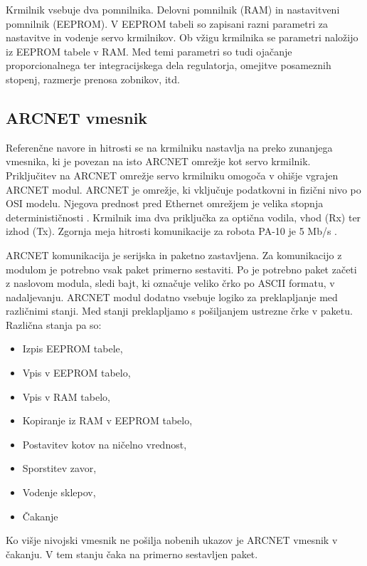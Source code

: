\documentclass[a4paper]{article}
\begin{document}
Krmilnik vsebuje dva pomnilnika. Delovni pomnilnik (RAM) in nastavitveni pomnilnik (EEPROM). V EEPROM tabeli so zapisani razni parametri za nastavitve in vodenje servo krmilnikov. Ob vžigu krmilnika se parametri naložijo iz EEPROM tabele v RAM. Med temi parametri so tudi ojačanje proporcionalnega ter integracijskega dela regulatorja, omejitve posameznih stopenj, razmerje prenosa zobnikov, itd.

\subsection{ARCNET vmesnik}\label{sec:arc_drive}

Referenčne navore in hitrosti se na krmilniku nastavlja na preko zunanjega vmesnika, ki je povezan na isto ARCNET omrežje kot servo krmilnik. Priključitev na ARCNET omrežje servo krmilniku omogoča v ohišje vgrajen ARCNET modul. ARCNET je omrežje, ki vključuje podatkovni in fizični nivo po OSI modelu. Njegova prednost pred Ethernet omrežjem je velika stopnja determinističnosti \cite{arc_tutorial}. Krmilnik ima dva priključka za optična 
vodila, vhod (Rx) ter izhod (Tx). Zgornja meja hitrosti komunikacije za robota PA-10 je 5 Mb/s \cite{pa10-manual}.

ARCNET komunikacija je serijska in paketno zastavljena. Za komunikacijo z modulom je potrebno vsak paket primerno sestaviti. Po \cite{pa10-manual} je potrebno paket začeti z naslovom modula, sledi bajt, ki označuje veliko črko po ASCII formatu, v nadaljevanju. ARCNET modul dodatno vsebuje logiko za preklapljanje med različnimi stanji. Med stanji preklapljamo s pošiljanjem ustrezne črke v paketu. Različna stanja pa so:


\begin{itemize}
	\item Izpis EEPROM tabele,
	\item Vpis v EEPROM tabelo,
	\item Vpis v RAM tabelo,
	\item Kopiranje iz RAM v EEPROM tabelo,
	\item Postavitev kotov na ničelno vrednost,	
	\item Sporstitev zavor,
	\item Vodenje sklepov,
	\item Čakanje
\end{itemize}

Ko višje nivojski vmesnik ne pošilja nobenih ukazov je ARCNET vmesnik v čakanju. V tem stanju čaka na primerno sestavljen paket.
\end{document}
